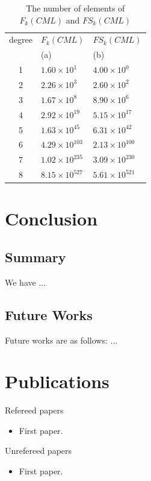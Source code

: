 \documentclass[12pt,dvipdfmx]{report}
\begin{document}
 \begin{table}[tb]
\begin{center}
\caption{The number of elements of $F_{k}(CML)$ and $FS_{k}(CML)$}
\label{tab:num_of_schemata_satisfied_srp}
 \begin{tabular}{c l l}
  \hline
 degree & $F_{k}(CML)$ &$FS_{k}(CML)$ \\
    & (a)&  (b)\\ 
  \hline
  \hline
  1 &  $1.60 \times 10^{1}$ & $4.00 \times 10^{0}$\\
  2 & $2.26 \times 10^{3}$ & $2.60 \times 10^{2}$  \\
  3 & $1.67 \times 10^{8}$ & $8.90 \times 10^{6}$\\
  4 & $2.92 \times 10^{19}$ & $5.15 \times 10^{17}$\\
  5 & $1.63 \times 10^{45}$ & $6.31 \times 10^{42}$\\
  6 & $4.29 \times 10^{103}$ & $2.13 \times 10^{100}$\\
  7 & $1.02 \times 10^{235}$ & $3.09 \times 10^{230}$\\
  8 & $8.15 \times 10^{527}$ & $5.61 \times 10^{521}$\\ 
  \hline
 \end{tabular}
\end{center}
\end{table}


\chapter{Conclusion}
\section{Summary}

We have ...

\section{Future Works}

Future works are as follows: ...


\chapter*{Publications}

\begin{list}%
 {} %
 {} %
 \item Refereed papers
       \begin{itemize}
	\item First paper.
       \end{itemize}
 \item Unrefereed papers
       \begin{itemize}
	\item First paper.
       \end{itemize}
\end{list}
\end{document}
